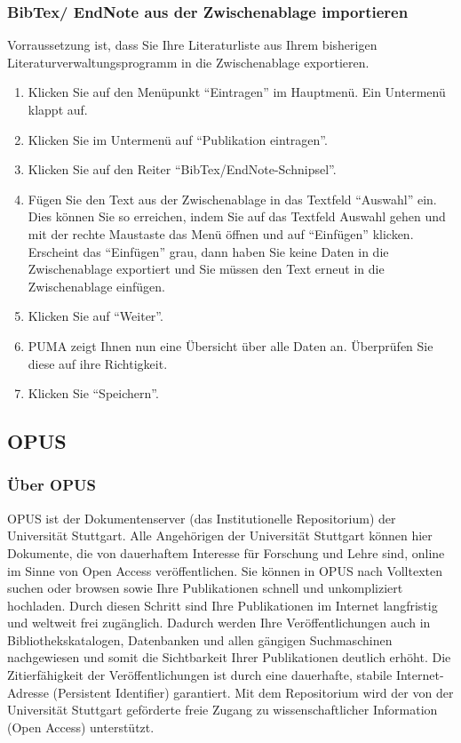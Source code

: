 \subsubsection{BibTex/ EndNote aus der Zwischenablage importieren}
Vorraussetzung ist, dass Sie Ihre Literaturliste aus Ihrem bisherigen Literaturverwaltungsprogramm in die Zwischenablage exportieren.
\begin{enumerate}
    \item Klicken Sie auf den Menüpunkt \enquote{Eintragen} im Hauptmenü. Ein Untermenü klappt auf.
    \item Klicken Sie im Untermenü auf \enquote{Publikation eintragen}.
    \item Klicken Sie auf den Reiter \enquote{BibTex/EndNote-Schnipsel}.
    \item Fügen Sie den Text aus der Zwischenablage in das Textfeld \enquote{Auswahl} ein. Dies können Sie so erreichen, indem Sie auf das Textfeld Auswahl gehen und mit der rechte Maustaste das Menü öffnen und auf \enquote{Einfügen} klicken. Erscheint das \enquote{Einfügen} grau, dann haben Sie keine Daten in die Zwischenablage exportiert und Sie müssen den Text erneut in die Zwischenablage einfügen.
    \item Klicken Sie auf \enquote{Weiter}.
    \item PUMA zeigt Ihnen nun eine Übersicht über alle Daten an. Überprüfen Sie diese auf ihre Richtigkeit.
    \item Klicken Sie \enquote{Speichern}.
\end{enumerate}
\subsection{OPUS}
\subsubsection{Über OPUS}
OPUS ist der Dokumentenserver (das Institutionelle Repositorium) der Universität Stuttgart. Alle Angehörigen der Universität Stuttgart können hier Dokumente, die von dauerhaftem Interesse für Forschung und Lehre sind, online im Sinne von Open Access veröffentlichen.
\newline\newline
Sie können in OPUS nach Volltexten suchen oder browsen sowie Ihre Publikationen schnell und unkompliziert hochladen. Durch diesen Schritt sind Ihre Publikationen im Internet langfristig und weltweit frei zugänglich. Dadurch werden Ihre Veröffentlichungen auch in Bibliothekskatalogen, Datenbanken und allen gängigen Suchmaschinen nachgewiesen und somit die Sichtbarkeit Ihrer Publikationen deutlich erhöht.
\newline\newline
Die Zitierfähigkeit der Veröffentlichungen ist durch eine dauerhafte, stabile Internet-Adresse (Persistent Identifier) garantiert.
\newline\newline
Mit dem Repositorium wird der von der Universität Stuttgart geförderte freie Zugang zu wissenschaftlicher Information (Open Access) unterstützt.

